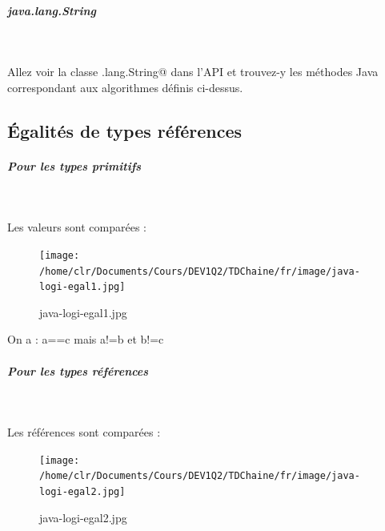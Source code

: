 \documentclass[11pt,a4paper]{article}
\begin{document}
		\subparagraph{java.lang.String} 
		
					\textcolor{white}{.} \par
				
		    Allez voir la classe \verb@java.lang.String@ dans l'API
		    et trouvez-y les m\'ethodes Java correspondant aux algorithmes d\'efinis ci-dessus.
		  
            \par
        
            \par
        \subsection{\'Egalit\'es de types r\'ef\'erences}
			
		\subparagraph{Pour les types primitifs} 
		
					\textcolor{white}{.} \par
				
		    Les valeurs sont compar\'ees :
		  
            \par
        \begin{figure}[hbt]
				    \begin{center}
					\texttt{[image: /home/clr/Documents/Cours/DEV1Q2/TDChaine/fr/image/java-logi-egal1.jpg]}
						\end{center}
                
                    \caption[java-logi-egal1.jpg]{java-logi-egal1.jpg}
                \end{figure}
                    
            \par
        
        On a : a==c mais a!=b et b!=c
      
            \par
        
			
		\subparagraph{Pour les types r\'ef\'erences} 
		
					\textcolor{white}{.} \par
				
		    Les r\'ef\'erences sont compar\'ees :
		  
            \par
        \begin{figure}[hbt]
				    \begin{center}
					\texttt{[image: /home/clr/Documents/Cours/DEV1Q2/TDChaine/fr/image/java-logi-egal2.jpg]}
						\end{center}
                
                    \caption[java-logi-egal2.jpg]{java-logi-egal2.jpg}
                \end{figure}
                    
\end{document}

